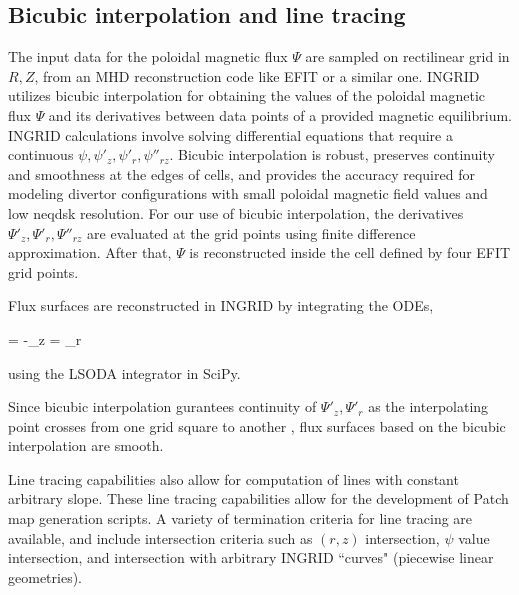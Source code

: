 \subsection{\label{sec:level2}Bicubic interpolation and line tracing}
The input data for the poloidal magnetic flux $\Psi$ are sampled on
rectilinear grid in $R,Z$, from an MHD reconstruction code like EFIT
or a similar one. INGRID utilizes bicubic interpolation for obtaining
the values of the poloidal magnetic flux $\Psi$ and its derivatives
between data points of a provided magnetic equilibrium. INGRID
calculations involve solving differential equations that require a
continuous $\psi, \psi'_{z}, \psi'_{r}, \psi''_{rz}$. Bicubic
interpolation is robust, preserves continuity and smoothness at the
edges of cells, and provides the accuracy required for modeling
divertor configurations with small poloidal magnetic field values and
low neqdsk resolution. For our use of bicubic interpolation, the
derivatives $\Psi'_{z}, \Psi'_{r}, \Psi''_{rz}$ are evaluated at the
grid points using finite difference approximation. After that, $\Psi$
is reconstructed inside the cell defined by four EFIT grid points.

Flux surfaces are reconstructed in INGRID by integrating the ODEs,

\beq
%
 = -\psi_{z} \quad {} = \psi_{r}
%
\eeq

using the LSODA integrator in SciPy.


Since bicubic interpolation gurantees continuity of $\Psi'_{z},
\Psi'_{r}$ as the interpolating point crosses from one grid square to
another \cite{Press_1992}, flux surfaces based on the bicubic
interpolation are smooth.


\noindent
Line tracing capabilities also allow for computation of lines with
constant arbitrary slope. These line tracing capabilities allow for
the development of Patch map generation scripts. A variety of
termination criteria for line tracing are available, and include
intersection criteria such as $(r,z)$ intersection, $\psi$ value
intersection, and intersection with arbitrary INGRID ``curves"
(piecewise linear geometries).
